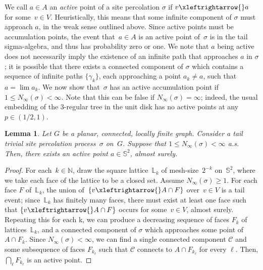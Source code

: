 \documentclass[11pt,letterpaper]{amsart}
\newcounter{n}
\numberwithin{n}{section}
\theoremstyle{plain}
\newtheorem{lemma}[n]{Lemma}
\theoremstyle{definition}
\theoremstyle{remark}
\newcommand\bbS{\mathbb S}
\renewcommand\L{\mathbb L}
\newcommand\N{\mathbb N}
\newcommand{\1}{\mathbbm{1}}
\begin{document}
We call $a \in A$ an {\em active} point of a site percolation $\sigma$ if $v  \xleftrightarrow{} a$ for some~$v\in V$. 
Heuristically, this means that some infinite component of $\sigma$ must approach $a$, in the weak sense outlined above. Since active points must be accumulation points, the event that~$a\in A$ is an active point of~$\sigma$ is in the tail sigma-algebra, and thus has probability zero or one. 
We note that $a$ being active does not necessarily imply the existence of an infinite path that approaches $a$ in $\sigma$; it is possible that there exists a connected component of $\sigma$ which contains a sequence of infinite paths $\{\gamma_k\}$, each approaching a point $a_k \neq a$, such that $a = \lim a_k$. 
We now show that~$\sigma$ has an active accumulation point if~$1\leq N_\infty(\sigma) <\infty$. 
Note that this can be false if $N_\infty(\sigma) =\infty$; indeed, the usual embedding of the $3$-regular tree in the unit disk has no active points at any $p \in (1/2,1)$.

\begin{lemma}\label{lem:activating-accum-pt}
	Let $G$ be a planar, connected, locally finite graph.
	Consider a tail trivial site percolation process~$\sigma$ on~$G$.
	Suppose that $1 \leq N_{\infty}(\sigma) < \infty$ a.s.
	Then, there exists an active point $a \in \mathbb{S}^2$, almost surely.  
\end{lemma}

\begin{proof}
	For each~$k\in \N$, draw the square lattice~$\L_k$ of mesh-size~$2^{-k}$ on~$\bbS^2$, where we take each face of the lattice to be a closed set. Assume $N_\infty(\sigma) \geq 1$. For each face $F$ of~$\L_k$, the union of~$\{v \xleftrightarrow{}  A \cap F\}$ over~$v\in V$ is a tail event; since~$\L_k$ has finitely many faces, there must exist at least one face such that $\{v \xleftrightarrow{}  A \cap F\}$ occurs for some~$v\in V$, almost surely. Repeating this for each k, we can produce a decreasing sequence of faces $F_k$ of lattices~$\L_k$, and a connected component of $\sigma$ which approaches some point of $A \cap F_k$. 
	Since $N_{\infty}(\sigma) < \infty$, we can find a single connected component $\mathcal{C}$ and some subsequence of faces $F_{k_\ell}$ such that $\mathcal{C}$ connects to $A \cap F_{k_\ell}$ for every $\ell$.
	Then, $\bigcap_\ell F_{k_\ell}$ is an active point.
\end{proof}
\end{document}
